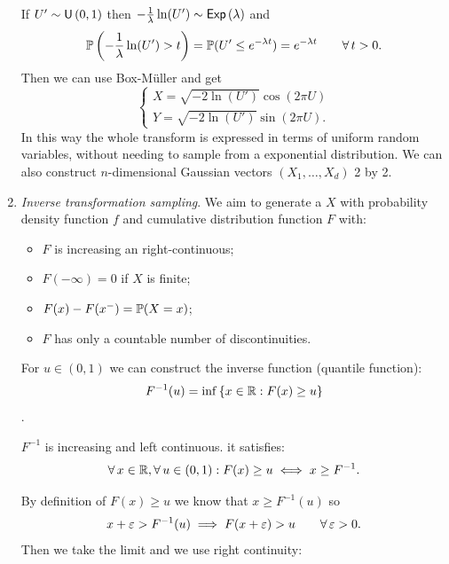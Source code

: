 \documentclass[12pt]{report}
\begin{document}
\begin{enumerate}[\circnum]
\begin{fancyproof}
	\end{fancyproof}
	If $U'\sim\mathsf{U}\left(0,1\right)$ then $-\frac{1}{\lambda}\ln(U')\sim\mathsf{Exp}\left(\lambda\right)$ and 
	\begin{equation*}
		\mathbb{P}\left(-\frac{1}{\lambda}\ln(U')>t\right)=\mathbb{P}(U'\leq e^{-\lambda t})=e^{-\lambda t}\qquad\forall\, t>0.
	\end{equation*}
	Then we can use Box-Müller and get
	\begin{equation*}
		\begin{cases}
			X=\sqrt{-2\ln(U')}\cos(2\pi U)\\
			Y=\sqrt{-2\ln(U')}\sin(2\pi U).
		\end{cases}
	\end{equation*}
	In this way the whole transform is expressed in terms of uniform random variables, without needing to sample from a exponential distribution. We can also construct $n$-dimensional Gaussian vectors $(X_{1},\ldots,X_{d})$ 2 by 2.
	\item \emph{Inverse transformation sampling}. We aim to generate a \rv{} $X$ with probability density function $f$ and cumulative distribution function $F$ with:
	\begin{itemize}
		\item $F$ is increasing an right-continuous;
		\item $F(-\infty)=0$ if $X$ is finite;
		\item $F(x)-F(x^{-})=\mathbb{P}(X=x)$;
		\item $F$ has only a countable number of discontinuities.
	\end{itemize}
	For $u\in(0,1)$ we can construct the inverse function (quantile function):
	\begin{equation*}
		F^{-1}(u)=\inf\left\{x\in\mathbb{R}:F(x)\geq u\right\}
	\end{equation*}.
	\begin{proposition}
		$F^{-1}$ is increasing and left continuous. it satisfies:
		\begin{equation*}
			\forall\, x\in\mathbb{R},\forall\, u\in(0,1):F(x)\geq u\iff x\geq F^{-1}.
		\end{equation*}
	\end{proposition}
	\begin{fancyproof}
		By definition of $F(x)\geq u$ we know that $x\geq F^{-1}(u)$ so
		\begin{equation*}
			x+\varepsilon>F^{-1}(u)\implies F(x+\varepsilon)>u \qquad\forall\,\varepsilon>0.
		\end{equation*}
		Then we take the limit and we use right continuity:
		\begin{equation*}

\end{equation*}
\end{fancyproof}
\end{enumerate}
\end{document}
